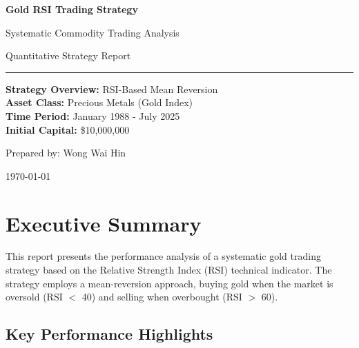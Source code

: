 \documentclass[11pt,a4paper]{article}
\begin{document}
\begin{titlepage}
\centering
\vspace*{2cm}

{\Huge\bfseries Gold RSI Trading Strategy}

\vspace{1cm}

{\LARGE Systematic Commodity Trading Analysis}

\vspace{2cm}

{\Large Quantitative Strategy Report}

\vspace{1cm}

\rule{\linewidth}{0.2mm}

\vspace{1cm}

{\large
\textbf{Strategy Overview:} RSI-Based Mean Reversion\\
\textbf{Asset Class:} Precious Metals (Gold Index)\\
\textbf{Time Period:} January 1988 - July 2025\\
\textbf{Initial Capital:} \$10,000,000\\
}

\vspace{2cm}

{\large Prepared by: Wong Wai Hin}

\vspace{0.5cm}

{\large \today}

\vfill

\end{titlepage}

\section{Executive Summary}

This report presents the performance analysis of a systematic gold trading strategy based on the Relative Strength Index (RSI) technical indicator. The strategy employs a mean-reversion approach, buying gold when the market is oversold (RSI $<$ 40) and selling when overbought (RSI $>$ 60).

\subsection{Key Performance Highlights}
\end{document}
